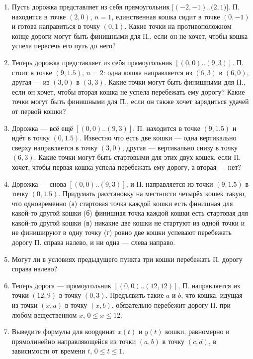 \begin{enumerate}

\item Пусть дорожка представляет из себя прямоугольник $[(-2,-1)..(2,$\linebreak $1)]$. П. находится в точке $(2,0)$, $n=1$, единственная кошка сидит в точке $(0,-1)$ и готова направиться в точку $(0,1)$. Какие точки на противоположном конце дороги могут быть финишными для П., если он не хочет, чтобы кошка успела пересечь его путь до него?

\item Теперь дорожка представляет из себя прямоугольник $[(0,0)..(9,3)]$. П. стоит в точке $(9,1.5)$, $n=2$: одна кошка направляется из $(6,3)$ в $(6,0)$, другая — из $(3,0)$ в $(3,3)$. Какие точки могут быть финишными для П., если он хочет, чтобы вторая кошка не успела перебежать ему дорогу? Какие точки могут быть финишными для П., если он также хочет зарядиться удачей от первой кошки?

\item Дорожка — всё ещё $[(0,0)..(9,3)]$, П. находится в точке $(9,1.5)$ и идёт в точку $(0,1.5)$. Известно что есть две кошки — одна вертикально сверху направляется в точку $(3,0)$, другая --- вертикально снизу в точку $(6,3)$. Какие точки могут быть стартовыми для этих двух кошек, если П. хочет, чтобы первая кошка успела перебежать ему дорогу, а вторая --- нет?

\item Дорожка — снова $[(0,0)..(9,3)]$, и П. направляется из точки $(9,1.5)$ в точку $(0,1.5)$. Придумать расстановку на местности четырёх кошек такую, что одновременно (а) стартовая точка каждой кошки есть финишная для какой-то другой кошки (б) финишная точка каждой кошки есть стартовая для какой-то другой кошки (в) никакие две кошки не стартуют из одной точки и не финишируют в одну точку (г) ровно две кошки успевают перебежать дорогу П. справа налево, и ни одна — слева направо.

\item Могут ли в условиях предыдущего пункта три кошки перебежать П. дорогу справа налево?

\item Теперь дорога — прямоугольник $[(0,0)..(12,12)]$, П. направляется из точки $(12,9)$ в точку $(0,3)$. Предъявить такие $a$ и $b$, что кошка, идущая из точки $(x,a)$ в точку $(x,b)$, обязательно перебежит дорогу П. при любом вещественном $x$, $0 \leq x \leq 12$.

\item Выведите формулы для координат $x(t)$ и $y(t)$ кошки, равномерно и прямолинейно направляющейся из точки $(a,b)$ в точку $(c,d)$, в зависимости от времени $t$, $0 \leq t \leq 1$.

\end{enumerate}